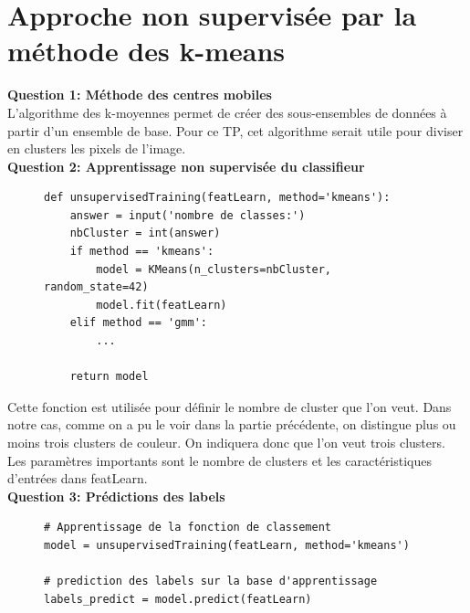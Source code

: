 \section{Approche non supervisée par la méthode des k-means}

\textbf{Question 1: Méthode des centres mobiles} \\

L'algorithme des k-moyennes permet de créer des sous-ensembles de données à partir d'un ensemble de base. Pour ce TP, cet
algorithme serait utile pour diviser en clusters les pixels de l'image. \\

\textbf{Question 2: Apprentissage non supervisée du classifieur}

\begin{figure}[!h]
    \begin{verbatim}
def unsupervisedTraining(featLearn, method='kmeans'):
    answer = input('nombre de classes:')
    nbCluster = int(answer)
    if method == 'kmeans':
        model = KMeans(n_clusters=nbCluster, random_state=42)
        model.fit(featLearn)
    elif method == 'gmm':
        ...

    return model
    \end{verbatim}   
\end{figure}


Cette fonction est utilisée pour définir le nombre de cluster que l'on veut. Dans notre cas, comme on a pu le voir dans
la partie précédente, on distingue plus ou moins trois clusters de couleur. On indiquera donc que l'on veut trois clusters. \\ 

Les paramètres importants sont le nombre de clusters et les caractéristiques d'entrées dans featLearn.\\

\textbf{Question 3: Prédictions des labels}

\begin{figure}[!h]
    \begin{verbatim}
# Apprentissage de la fonction de classement
model = unsupervisedTraining(featLearn, method='kmeans')

# prediction des labels sur la base d'apprentissage
labels_predict = model.predict(featLearn)
    \end{verbatim}   
\end{figure}

